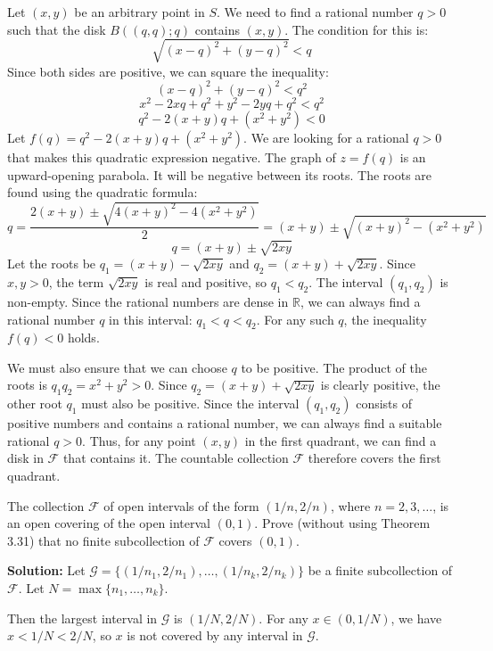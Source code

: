Let $(x, y)$ be an arbitrary point in $S$. We need to find a rational number $q > 0$ such that the disk $B((q,q); q)$ contains $(x, y)$. The condition for this is:
$$\sqrt{(x-q)^2 + (y-q)^2} < q$$
Since both sides are positive, we can square the inequality:
$$(x-q)^2 + (y-q)^2 < q^2$$
$$x^2 - 2xq + q^2 + y^2 - 2yq + q^2 < q^2$$
$$q^2 - 2(x+y)q + (x^2+y^2) < 0$$
Let $f(q) = q^2 - 2(x+y)q + (x^2+y^2)$. We are looking for a rational $q > 0$ that makes this quadratic expression negative. The graph of $z=f(q)$ is an upward-opening parabola. It will be negative between its roots. The roots are found using the quadratic formula:
$$q = \frac{2(x+y) \pm \sqrt{4(x+y)^2 - 4(x^2+y^2)}}{2} = (x+y) \pm \sqrt{(x+y)^2 - (x^2+y^2)}$$
$$q = (x+y) \pm \sqrt{2xy}$$
Let the roots be $q_1 = (x+y) - \sqrt{2xy}$ and $q_2 = (x+y) + \sqrt{2xy}$. Since $x,y > 0$, the term $\sqrt{2xy}$ is real and positive, so $q_1 < q_2$. The interval $(q_1, q_2)$ is non-empty.
Since the rational numbers are dense in $\mathbb{R}$, we can always find a rational number $q$ in this interval: $q_1 < q < q_2$. For any such $q$, the inequality $f(q) < 0$ holds.

We must also ensure that we can choose $q$ to be positive. The product of the roots is $q_1 q_2 = x^2+y^2 > 0$. Since $q_2 = (x+y) + \sqrt{2xy}$ is clearly positive, the other root $q_1$ must also be positive.
Since the interval $(q_1, q_2)$ consists of positive numbers and contains a rational number, we can always find a suitable rational $q > 0$.
Thus, for any point $(x,y)$ in the first quadrant, we can find a disk in $\mathcal{F}$ that contains it. The countable collection $\mathcal{F}$ therefore covers the first quadrant.


\begin{problembox}
The collection \( \mathcal{F} \) of open intervals of the form \( (1/n, 2/n) \), where \( n = 2, 3, \ldots \), is an open covering of the open interval \( (0, 1) \). Prove (without using Theorem 3.31) that no finite subcollection of \( \mathcal{F} \) covers \( (0, 1) \).
\end{problembox}

\textbf{Solution:} Let $\mathcal{G} = \{(1/n_1, 2/n_1), \ldots, (1/n_k, 2/n_k)\}$ be a finite subcollection of $\mathcal{F}$. Let $N = \max\{n_1, \ldots, n_k\}$.

Then the largest interval in $\mathcal{G}$ is $(1/N, 2/N)$. For any $x \in (0, 1/N)$, we have $x < 1/N < 2/N$, so $x$ is not covered by any interval in $\mathcal{G}$.

